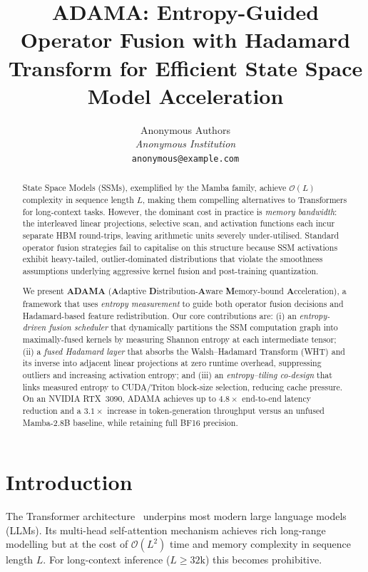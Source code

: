 \documentclass{article}
\title{ADAMA: Entropy-Guided Operator Fusion with Hadamard\\
Transform for Efficient State Space Model Acceleration}
\author{%
  Anonymous Authors\\
  \textit{Anonymous Institution}\\
  \texttt{anonymous@example.com}
}
\begin{document}
\maketitle

\begin{abstract}
State Space Models (SSMs), exemplified by the Mamba family, achieve
$\mathcal{O}(L)$ complexity in sequence length $L$, making them compelling
alternatives to Transformers for long-context tasks.  However, the dominant
cost in practice is \emph{memory bandwidth}: the interleaved linear
projections, selective scan, and activation functions each incur separate HBM
round-trips, leaving arithmetic units severely under-utilised.  Standard
operator fusion strategies fail to capitalise on this structure because SSM
activations exhibit heavy-tailed, outlier-dominated distributions that
violate the smoothness assumptions underlying aggressive kernel fusion and
post-training quantization.

We present \textbf{ADAMA} (\textbf{A}daptive \textbf{D}istribution-\textbf{A}ware
\textbf{M}emory-bound \textbf{A}cceleration), a framework that uses
\emph{entropy measurement} to guide both operator fusion decisions and
Hadamard-based feature redistribution.  Our core contributions are:
(i) an \emph{entropy-driven fusion scheduler} that dynamically partitions
the SSM computation graph into maximally-fused kernels by measuring
Shannon entropy at each intermediate tensor;
(ii) a \emph{fused Hadamard layer} that absorbs the Walsh–Hadamard Transform
(WHT) and its inverse into adjacent linear projections at zero runtime
overhead, suppressing outliers and increasing activation entropy; and
(iii) an \emph{entropy–tiling co-design} that links measured entropy to
CUDA/Triton block-size selection, reducing cache pressure.
On an NVIDIA RTX~3090, ADAMA achieves up to $4.8\times$ end-to-end latency
reduction and a $3.1\times$ increase in token-generation throughput versus an
unfused Mamba-2.8B baseline, while retaining full BF16 precision.
\end{abstract}

\section{Introduction}
\label{sec:intro}

The Transformer architecture~\citep{vaswani2017attention} underpins most
modern large language models (LLMs).  Its multi-head self-attention mechanism
achieves rich long-range modelling but at the cost of $\mathcal{O}(L^2)$
time and memory complexity in sequence length $L$.  For long-context
inference ($L \geq 32\text{k}$) this becomes prohibitive.
\end{document}
